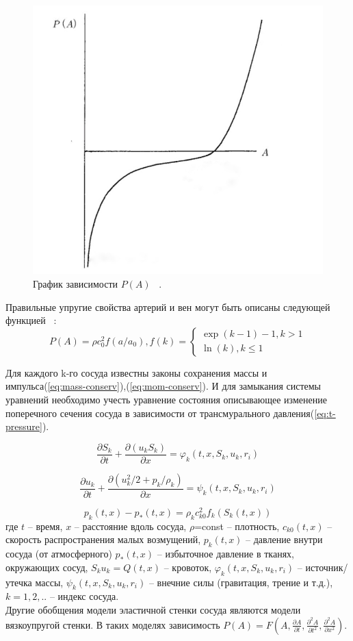 \begin{figure}[h]
\centering
\includegraphics[width=0.3\linewidth]{IMG_20230309_021324_943-01.jpeg}
\caption{ График зависимости $P(A)$ ~\cite{pedly:1998}.}
\label{fig:mpr}
\end{figure}

Правильные упругие свойства артерий и вен могут быть описаны следующей функцией ~\cite{holodov:2001}:
\begin{equation}
    \label{eq:elastic-propeties}
    P(A)=\rho c^2_0 f(a/a_0), 
    f(k)=\begin{cases}
    \exp(k-1)-1, k>1 \\ \ln(k), k \leq 1
    \end{cases}
\end{equation}

Для каждого k-го сосуда известны законы сохранения массы и импульса(\ref{eq:mass-conserv}),(\ref{eq:mom-conserv}). И для замыкания системы уравнений необходимо учесть уравнение состояния описывающее изменение поперечного сечения сосуда в зависимости от трансмурального давления(\ref{eq:t-pressure}).

\begin{equation}
    \label{eq:mass-conserv}
    \frac{\partial S_k}{ \partial t} + \frac{\partial(u_kS_k)}{\partial x}=\varphi _k(t,x,S_k,u_k,r_i)
\end{equation}

\begin{equation}
    \label{eq:mom-conserv}
    \frac{\partial u_k}{\partial t} + \frac{\partial(u_k^2/2+p_k/\rho_k)}{\partial x}= \psi_k(t,x,S_k,u_k,r_i)
\end{equation}

\begin{equation}
    \label{eq:t-pressure}
    p_k(t,x)-p_*(t,x)=\rho_k c^2_{k0}f_k(S_k(t,x))
\end{equation}
где $t$ -- время, $x$ -- расстояние вдоль сосуда, $\rho$=const -- плотность, $c_{k0}(t,x)$ -- скорость распространения малых возмущений,  $p_k(t,x)$ -- давление внутри сосуда (от атмосферного) $p_*(t,x)$ -- избыточное давление в тканях, окружающих сосуд, $S_ku_k=Q(t,x)$ -- кровоток, $\varphi _k(t,x,S_k,u_k,r_i)$ -- источник/утечка массы, $\psi_k(t,x,S_k,u_k,r_i)$ -- внечние силы (гравитация, трение и т.д.), $k=1,2,..$ -- индекс сосуда.
\\ 
Другие обобщения модели эластичной стенки сосуда являются модели вязкоупругой стенки. В таких моделях зависимость 
$
P(A)=F\left(A,\frac{\partial A}{ \partial t},\frac{\partial^2A }{\partial t^2},\frac{\partial^2A}{\partial x^2}\right)
$.\\

